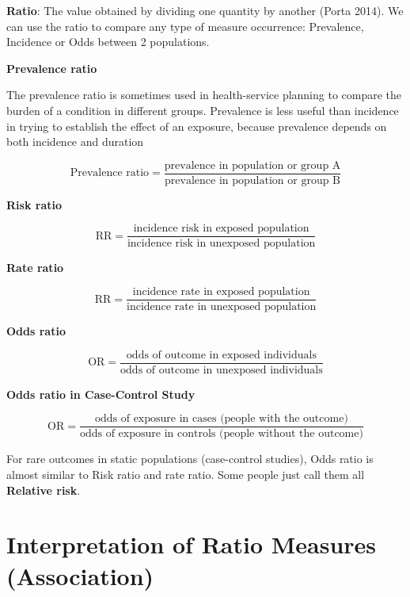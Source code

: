 \documentclass[
  letterpaper,
  DIV=11,
  numbers=noendperiod]{scrreprt}
\begin{document}
\textbf{Ratio}: The value obtained by dividing one quantity by another
(Porta 2014). We can use the ratio to compare any type of measure
occurrence: Prevalence, Incidence or Odds between 2 populations.

\textbf{Prevalence ratio}

The prevalence ratio is sometimes used in health-service planning to
compare the burden of a condition in different groups. Prevalence is
less useful than incidence in trying to establish the effect of an
exposure, because prevalence depends on both incidence and duration

\[\text{Prevalence ratio} = \frac{\text{prevalence in population or group A}}{\text{prevalence in population or group B}}\]

\textbf{Risk ratio}

\[\text{RR} = \frac{\text{incidence risk in exposed population}}{\text{incidence risk in unexposed population}}\]

\textbf{Rate ratio}

\[\text{RR} = \frac{\text{incidence rate in exposed population}}{\text{incidence rate in unexposed population}}\]

\textbf{Odds ratio}

\[\text{OR} = \frac{\text{odds of outcome in exposed individuals}}{\text{odds of outcome in unexposed individuals}}\]

\textbf{Odds ratio in Case-Control Study}

\[\text{OR} = \frac{\text{odds of exposure in cases (people with the outcome)}}{\text{odds of exposure in controls (people without the outcome)}}\]

\begin{tcolorbox}[enhanced jigsaw, bottomtitle=1mm, breakable, colframe=quarto-callout-important-color-frame, leftrule=.75mm, opacityback=0, opacitybacktitle=0.6, left=2mm, colbacktitle=quarto-callout-important-color!10!white, coltitle=black, rightrule=.15mm, toptitle=1mm, colback=white, titlerule=0mm, title=\textcolor{quarto-callout-important-color}{\faExclamation}\hspace{0.5em}{Important}, arc=.35mm, bottomrule=.15mm, toprule=.15mm]

For rare outcomes in static populations (case-control studies), Odds
ratio is almost similar to Risk ratio and rate ratio. Some people just
call them all \textbf{Relative risk}.

\end{tcolorbox}

\hypertarget{interpretation-of-ratio-measures-association}{%
\section{Interpretation of Ratio Measures
(Association)}\label{interpretation-of-ratio-measures-association}}
\end{document}
